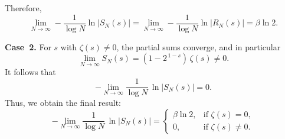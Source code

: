 \documentclass[aps,pra,twocolumn,superscriptaddress,preprintnumbers,amsmath,amssymb]{revtex4-2}
\begin{document}
Therefore,
\begin{equation}
    \lim_{N \to \infty}
    -\frac{1}{\log N}\ln |S_N(s)| =\lim_{N \to \infty}
    -\frac{1}{\log N}\ln |R_N(s)| = \beta\ln2.
\end{equation}\par
\textbf{Case~2.}  For $s$ with $\zeta(s)\neq 0$, the partial sums converge, and in particular
\begin{equation}
    \lim_{N\to\infty} S_N(s)
    = (1-2^{\,1-s})\,\zeta(s)
    \neq 0.
\end{equation}
It follows that
\begin{equation}
    -\lim_{N\to\infty}\frac{1}{\log N}\,\ln|S_N(s)|=0.
\end{equation}
Thus, we obtain the final result:
\begin{equation}
-\lim_{N\to\infty}\frac{1}{\log N}\,\ln |S_N(s)|
=\begin{cases}
\beta\ln 2, & \text{if $\zeta(s)=0$},\\[2pt]
0, & \text{if $\zeta(s)\neq 0$}.
\end{cases}
\end{equation}
\end{document}
